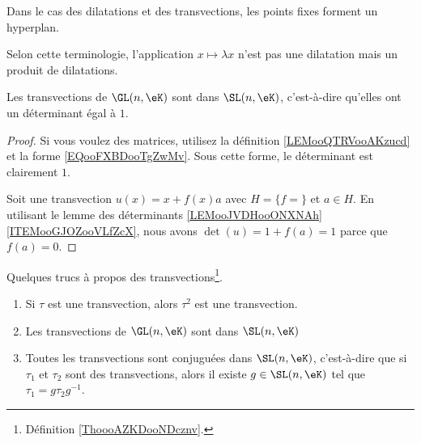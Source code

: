 \begin{normaltext}
	Dans le cas des dilatations et des transvections, les points fixes forment un hyperplan.

	Selon cette terminologie, l'application \( x\mapsto \lambda x\) n'est pas une dilatation mais un produit de dilatations.
\end{normaltext}

\begin{proposition}	\label{PROPooNCKGooTuaYeq}
	Les transvections de \( \GL(n,\eK)\) sont dans \( \SL(n,\eK)\), c'est-à-dire qu'elles ont un déterminant égal à \( 1\).
\end{proposition}

\begin{proof}
	Si vous voulez des matrices, utilisez la définition \ref{LEMooQTRVooAKzucd} et la forme \eqref{EQooFXBDooTgZwMv}. Sous cette forme, le déterminant est clairement \( 1\).

	Soit une transvection \( u(x)=x+f(x)a\) avec \( H=\{ f= \}\) et \( a\in H\). En utilisant le lemme des déterminants \ref{LEMooJVDHooONXNAh}\ref{ITEMooGJOZooVLfZcX}, nous avons \( \det(u)=1+f(a)=1\) parce que \( f(a)=0\).
\end{proof}

\begin{lemma}	\label{LEMooYTUSooKqDJce}
	Quelques trucs à propos des transvections\footnote{Définition \ref{ThoooAZKDooNDcznv}.}.
	\begin{enumerate}
		\item		\label{ITEMooOGTOooVGYOUA}
		      Si \( \tau\) est une transvection, alors \( \tau^2\) est une transvection.
		\item		\label{ITEMooCSBVooTWYMvd}
		      Les transvections de \( \GL(n,\eK)\) sont dans \( \SL(n,\eK)\)
		\item		\label{ITEMooYQKNooYCbpBP}
		      Toutes les transvections sont conjuguées dans \( \SL(n,\eK)\), c'est-à-dire que si \( \tau_1\) et \( \tau_2\) sont des transvections, alors il existe \( g\in \SL(n,\eK)\) tel que \( \tau_1=g\tau_2g^{-1}\).
	\end{enumerate}
\end{lemma}


